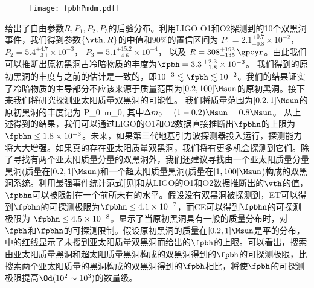 \begin{figure}[h!]
    \centering
    \texttt{[image: fpbhPmdm.pdf]}
\end{figure}
给出了自由参数${R, P_1, P_2, P_3}$的后验分布。利用LIGO O1和O2探测到的10个双黑洞事件，我们得到参数$\{\vth, R\}$的中值和$90\%$的置信区间为
$P_1 = 2.1^{+0.7}_{-0.8} \times 10^{-2}$，
$P_2 = 5.4^{+4.7}_{-3.1} \times 10^{-3}$，
$P_3 = 5.1^{+15.2}_{-4.6} \times 10^{-4}$，
以及 $R = 308^{+193}_{-135}\, \gpcyr$。由此我们可以推断出原初黑洞占冷暗物质的丰度为$\fpbh = 3.3\,^{+2.3}_{-1.8} \times 10^{-3}$。
我们得到的原初黑洞的丰度与之前的估计是一致的，即$10^{-3} \lesssim \fpbh \lesssim 10^{-2}$。我们的结果证实了冷暗物质的主导部分不应该来源于质量范围为$[0.2, 100]\Msun$的原初黑洞\citep{Sasaki:2016jop,Ali-Haimoud:2017rtz,Raidal:2017mfl,Kocsis:2017yty,Chen:2018czv,Chen:2018rzo}。接下来我们将研究探测亚太阳质量双黑洞的可能性。
我们将质量范围为$[0.2, 1]\Msun$的原初黑洞的丰度记为 
\e 
\fpbhn \equiv \fpbh P_0 \,\Delta m_0,
\q
其中$\Delta m_0 = (1 - 0.2) \Msun = 0.8 \Msun$。
从上述得到的结果，我们可以通过LIGO的O1和O2数据直接推断出$\fpbhn$的上限为$\fpbhn \le 1.8 \times 10^{-3}$。未来，如果第三代地基引力波探测器投入运行，探测能力将大大增强。如果真的存在亚太阳质量双黑洞，我们将有更多机会探测到它们。除了寻找有两个亚太阳质量分量的双黑洞外，我们还建议寻找由一个亚太阳质量分量黑洞(质量在$[0.2, 1]\Msun$)和一个超太阳质量黑洞(质量在$[1, 100]\Msun$)构成的双黑洞系统。利用最强事件统计范式[见]和从LIGO的O1和O2数据推断出的$\vth$的值，$\fpbhn$可以被限制在一个前所未有的水平。假设没有双黑洞被探测到，ET可以得到$\fpbhn$的可探测极限为$\fpbhn \le 4.1 \times 10^{-7}$，而CE可以得到$\fpbhn$的可探测极限为 $\fpbhn \le 4.5 \times 10^{-8}$。显示了当原初黑洞具有一般的质量分布时，对$\fpbh$和$\fpbhn$的可探测限制。假设原初黑洞的质量在$[0.2, 1]\Msun$是平的分布，中的红线显示了未搜到亚太阳质量双黑洞而给出的$\fpbh$的上限。可以看出，搜索由亚太阳质量黑洞和超太阳质量黑洞构成的双黑洞得到的$\fpbh$的可探测极限，比搜索两个亚太阳质量的黑洞构成的双黑洞得到的$\fpbh$相比，将使$\fpbh$的可探测极限提高$\Od(10^2 \sim 10^3)$的数量级。


